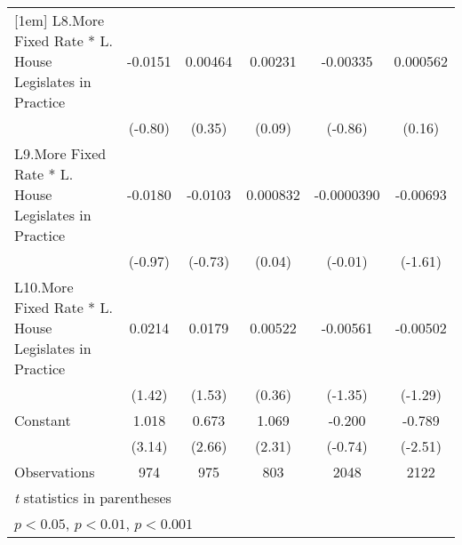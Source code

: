 {\begin{longtable}{l*{5}{c}}
[1em]
L8.More Fixed Rate * L. House Legislates in Practice&  -0.0151         &  0.00464         &  0.00231         & -0.00335         & 0.000562         \\
                &  (-0.80)         &   (0.35)         &   (0.09)         &  (-0.86)         &   (0.16)         \\
[1em]
L9.More Fixed Rate * L. House Legislates in Practice&  -0.0180         &  -0.0103         & 0.000832         &-0.0000390         & -0.00693         \\
                &  (-0.97)         &  (-0.73)         &   (0.04)         &  (-0.01)         &  (-1.61)         \\
[1em]
L10.More Fixed Rate * L. House Legislates in Practice&   0.0214         &   0.0179         &  0.00522         & -0.00561         & -0.00502         \\
                &   (1.42)         &   (1.53)         &   (0.36)         &  (-1.35)         &  (-1.29)         \\
[1em]
Constant        &    1.018\sym{**} &    0.673\sym{**} &    1.069\sym{*}  &   -0.200         &   -0.789\sym{*}  \\
                &   (3.14)         &   (2.66)         &   (2.31)         &  (-0.74)         &  (-2.51)         \\
\hline
Observations    &      974         &      975         &      803         &     2048         &     2122         \\
\hline\hline
\multicolumn{6}{l}{\footnotesize \textit{t} statistics in parentheses}\\
\multicolumn{6}{l}{\footnotesize \sym{*} \(p<0.05\), \sym{**} \(p<0.01\), \sym{***} \(p<0.001\)}\\
\end{longtable}
}
